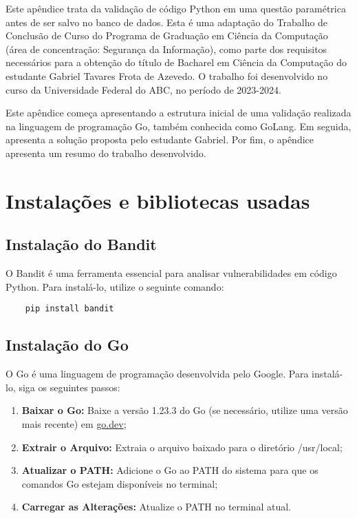 \label{ch:apendiceD}

Este apêndice trata da validação de código Python em uma questão paramétrica antes de ser salvo no banco de dados. Esta é uma adaptação do Trabalho de Conclusão de Curso do Programa de Graduação em Ciência da Computação (área de concentração: Segurança da Informação), como parte dos requisitos necessários para a obtenção do título de Bacharel em Ciência da Computação do estudante Gabriel Tavares Frota de Azevedo. O trabalho foi desenvolvido no curso da Universidade Federal do ABC, no período de 2023-2024. 

Este apêndice começa apresentando a estrutura inicial de uma validação realizada na linguagem de programação Go, também conhecida como GoLang. Em seguida, apresenta a solução proposta pelo estudante Gabriel. Por fim, o apêndice apresenta um resumo do trabalho desenvolvido.


\section{Instalações e bibliotecas usadas}

\subsection{Instalação do Bandit}
O Bandit é uma ferramenta essencial para analisar vulnerabilidades em código Python. Para instalá-lo, utilize o seguinte comando:

\begin{verbatim}
    pip install bandit
\end{verbatim}

\subsection{Instalação do Go}
O Go é uma linguagem de programação desenvolvida pelo Google. Para instalá-lo, siga os seguintes passos:

\begin{enumerate}
    \item \textbf{Baixar o Go:} Baixe a versão 1.23.3 do Go (se necessário, utilize uma versão mais recente) em \href{https://go.dev/doc/install}{go.dev};
    \item \textbf{Extrair o Arquivo:} Extraia o arquivo baixado para o diretório /usr/local;
    \item \textbf{Atualizar o PATH:} Adicione o Go ao PATH do sistema para que os comandos Go estejam disponíveis no terminal;
    \item \textbf{Carregar as Alterações:} Atualize o PATH no terminal atual.
\end{enumerate}

